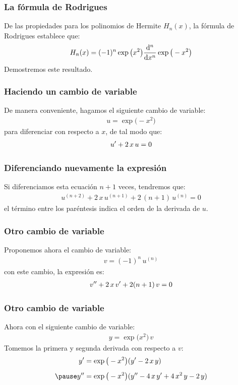 \documentclass[12pt]{beamer}
\begin{document}
\begin{frame}
\frametitle{La fórmula de Rodrigues}
De las propiedades para los polinomios de Hermite $H_{n} (x)$, la fórmula de Rodrigues establece que:
\pause
\begin{align*}
H_{n} (x) = (-1)^{n} \exp\big( x^{2} \big) \dv[n]{x} \exp\big( - x^{2} \big)
\end{align*}
\pause
Demostremos este resultado.
\end{frame}
\begin{frame}
\frametitle{Haciendo un cambio de variable}
De manera conveniente, hagamos el siguiente cambio de variable:
\pause
\begin{align*}
u =  \exp\big( - x^{2} \big)
\end{align*}
\pause
para diferenciar con respecto a $x$, de tal modo que:
\pause
\begin{align*}
{u}^{\prime} + 2 \, x \, u = 0
\end{align*}
\end{frame}
\begin{frame}
\frametitle{Diferenciando nuevamente la expresión}
Si diferenciamos esta ecuación $n + 1$ veces, tendremos que:
\pause
\begin{align*}
u^{(n+2)} + 2 \, x \, u^{(n+1)} +  2 \, (n + 1) \, u^{(n)} = 0
\end{align*}
el término entre los paréntesis indica el orden de la derivada de $u$.
\end{frame}
\begin{frame}
\frametitle{Otro cambio de variable}
Proponemos ahora el cambio de variable:
\pause
\begin{align*}
v = (-1)^{n} \, u^{(n)}
\end{align*}
\pause
con este cambio, la expresión es:
\pause
\begin{align}
{v}^{\prime \prime} + 2 \, x \, {v}^{\prime} + 2 (n + 1) \, v = 0
\label{eq:ecuacion_18_131}
\end{align}
\end{frame}
\begin{frame}
\frametitle{Otro cambio de variable}
Ahora con el siguiente cambio de variable:
\pause
\begin{align*}
y = \exp\big( x^{2} \big) \, v
\end{align*}
\pause
Tomemos la primera y segunda derivada con respecto a $v$:
\begin{eqnarray*}
\begin{aligned}
\pderivada{y} &= \exp\big( - x^{2} \big) ( \pderivada{y} - 2 \, x \, y) \\[0.5em] \pause
\sderivada{y} &= \exp\big( - x^{2} \big) ( \sderivada{y} - 4 \, x \, \pderivada{y} + 4 \, x^{2} \, y - 2 \, y)
\end{aligned}
\end{eqnarray*}
\end{frame}
\end{document}
